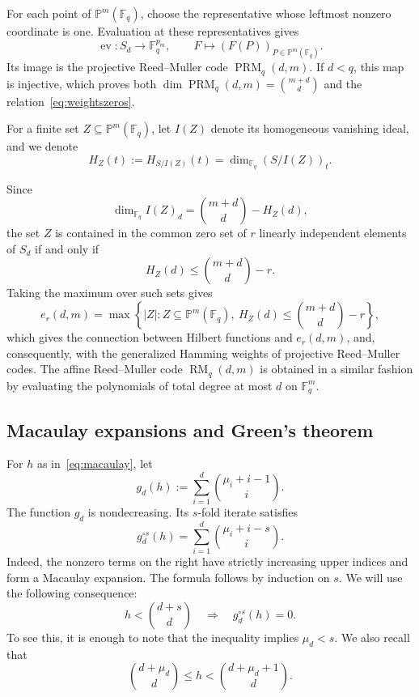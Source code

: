 \documentclass[11pt]{amsart}
\theoremstyle{definition}
\newcommand{\F}{\mathbb F}
\newcommand{\PP}{\mathbb P}
\newcommand{\ev}{\operatorname{ev}}
\newcommand{\PRM}{\operatorname{PRM}}
\newcommand{\RM}{\operatorname{RM}}
\newcommand{\card}[1]{\left|#1\right|}
\numberwithin{equation}{section}
\begin{document}
For each point of $\PP^m(\F_q)$, choose the representative whose leftmost nonzero coordinate is one. Evaluation at these representatives gives
\[
 \ev:S_d\longrightarrow\F_q^{p_m},
 \qquad F\longmapsto(F(P))_{P\in\PP^m(\F_q)}.
\]
Its image is the projective Reed--Muller code $\PRM_q(d,m)$. If
$d<q$, this map is injective, which proves both $\dim\PRM_q(d,m)=\binom{m+d}{d}$ and
the relation~\eqref{eq:weightszeros}.

For a finite set $Z\subseteq\PP^m(\F_q)$, let $I(Z)$ denote its
homogeneous vanishing ideal, and we denote 
$$H_Z(t):=H_{S/I(Z)}(t)=\dim_{\F_q}(S/I(Z))_t.$$

Since
\[
 \dim_{\F_q}I(Z)_d=\binom{m+d}{d}-H_Z(d),
\]
the set $Z$ is contained in the common zero set
of $r$ linearly independent elements of $S_d$ if and only if
\begin{equation}\label{eq:HZbound}
 H_Z(d)\le\binom{m+d}{d}-r.
\end{equation}
Taking the maximum over such sets gives
\[
 e_r(d,m)=
 \max\left\{
 \card Z: Z\subseteq\PP^m(\F_q),\
 H_Z(d)\le\binom{m+d}{d}-r
 \right\},
\]
which gives the connection between Hilbert functions and $e_r(d,m)$, and, consequently, with the generalized Hamming weights of projective Reed--Muller codes.
The affine Reed--Muller code $\RM_q(d,m)$ is obtained in a similar fashion by evaluating
the polynomials of total degree at most $d$ on $\F_q^m$.

\subsection{Macaulay expansions and Green's theorem}

For $h$ as in~\eqref{eq:macaulay}, let 
\[
 g_d(h):=\sum_{i=1}^d\binom{\mu_i+i-1}{i}.
\]
The function $g_d$ is nondecreasing. Its $s$-fold iterate satisfies
\[
 g_d^{\circ s}(h)=\sum_{i=1}^d\binom{\mu_i+i-s}{i}.
\]
Indeed, the nonzero terms on the right have strictly increasing upper
indices and form a Macaulay expansion. The formula follows by induction on $s$. We will use
the following consequence: 
\begin{equation}\label{eq:vanishthreshold}
 h<\binom{d+s}{d}\quad\Longrightarrow\quad
 g_d^{\circ s}(h)=0.
\end{equation}
To see this, it is enough to note that the inequality implies $\mu_d<s$.
We also recall that
\begin{equation}\label{eq:macrange}
 \binom{d+\mu_d}{d}\le h<\binom{d+\mu_d+1}{d}.
\end{equation}
\end{document}
